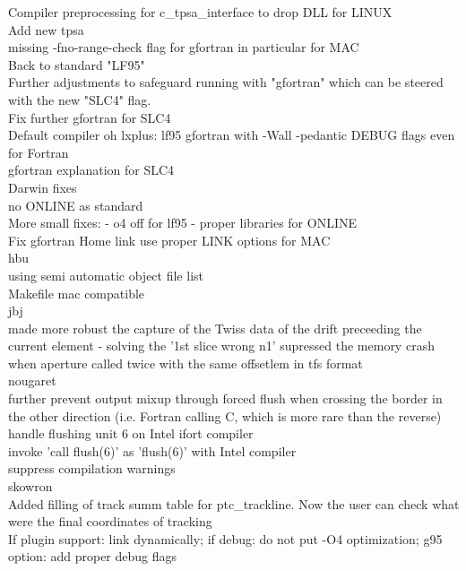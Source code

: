 Compiler preprocessing for c\_tpsa\_interface to drop DLL for LINUX  \\ 
Add new tpsa  \\ 
missing  -fno-range-check flag for gfortran in particular for MAC  \\ 
Back to standard "LF95"  \\ 
Further adjustments to safeguard running with "gfortran" which can be steered with the new "SLC4" flag.  \\ 
Fix further gfortran for SLC4  \\ 
Default compiler oh lxplus: lf95 gfortran with -Wall -pedantic DEBUG flags even for Fortran  \\ 
gfortran explanation for SLC4  \\ 
Darwin fixes  \\ 
no ONLINE as standard  \\ 
More small fixes: - o4 off for lf95 - proper libraries for ONLINE  \\ 
Fix gfortran Home link use proper LINK options for MAC  \\ 
hbu \\ 
using semi automatic object file list  \\ 
Makefile mac compatible  \\ 
jbj \\ 
made more robust the capture of the Twiss data of the drift preceeding the current element - solving the '1st slice wrong n1'  supressed the memory crash when aperture called twice with the same offsetlem in tfs format  \\ 
nougaret \\ 
further prevent output mixup through forced flush when crossing the border in the other direction (i.e. Fortran calling C, which is more rare than the reverse)  \\ 
handle flushing unit 6 on Intel ifort compiler  \\ 
invoke 'call flush(6)' as 'flush(6)' with Intel compiler  \\ 
suppress compilation warnings  \\ 
skowron \\ 
Added filling of track summ table for ptc\_trackline. Now the user can check what were the final coordinates of tracking  \\ 
If plugin support: link dynamically; if debug: do not put -O4 optimization; g95 option: add proper debug flags 
\\

